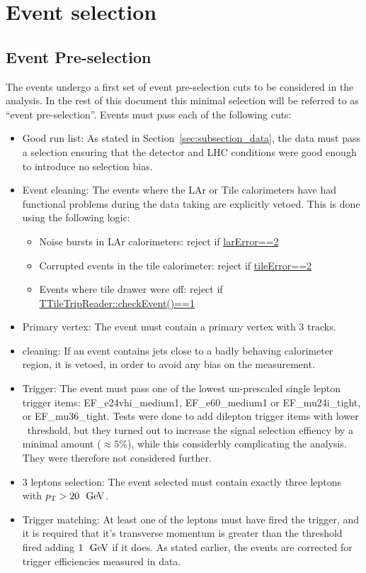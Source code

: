 \section{Event selection}
\label{sec:eventSelection}

\subsection{Event Pre-selection}
\label{sec:preselection}

The events undergo a first set of event pre-selection cuts to be considered in the analysis. In the rest of this document this minimal selection will be referred to as ``event pre-selection''. Events must pass each of the following cuts:

\begin{itemize}
	\item Good run list: As stated in Section~\ref{sec:subsection_data}, the data must pass a selection ensuring that the detector and LHC conditions were good enough to introduce no selection bias.
	\item Event cleaning: The events where the LAr or Tile calorimeters have had functional problems during the data taking are explicitly vetoed. This is done using the following logic:
	\begin{itemize}
		\item Noise bursts in LAr calorimeters: reject if \url{larError==2}
		\item Corrupted events in the tile calorimeter: reject if \url{tileError==2}
		\item Events where tile drawer were off: reject if \url{TTileTripReader::checkEvent()==1}
	\end{itemize}
		
	\item Primary vertex: The event must contain a primary vertex with 3 tracks.
	\item \met{} cleaning: If an event contains jets close to a badly behaving calorimeter region, it is vetoed, in order to avoid any bias on the \met{} measurement.
	\item Trigger: The event must pass one of the lowest un-prescaled single lepton trigger items: EF\_e24vhi\_medium1, EF\_e60\_medium1 or EF\_mu24i\_tight, or EF\_mu36\_tight. Tests were done to add dilepton trigger items with lower \pt\ threshold, but they turned out to increase the signal selection effiency by a minimal amount ($\approx{}5\%$), while this considerbly complicating the analysis. They were therefore not considered further.
	\item 3 leptons selection: The event selected must contain exactly three leptons with $\pt>20~\GeV$.
	\item Trigger matching:	At least one of the leptons must have fired the trigger, and it is required that it's transverse momentum is greater than the threshold fired adding $1~\GeV$ if it does. As stated earlier, the events are corrected for trigger efficiencies measured in data.
\end{itemize}

